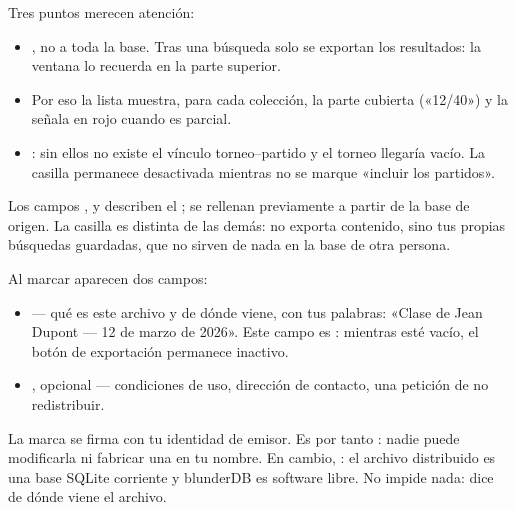 \documentclass[letterpaper,10pt,spanish]{sphinxmanual}
\begin{document}
\sphinxAtStartPar
Tres puntos merecen atención:
\begin{itemize}
\item {} 
\sphinxAtStartPar
{}, no a toda la base. Tras una búsqueda solo se exportan los resultados: la ventana lo recuerda en la parte superior.

\item {} 
\sphinxAtStartPar
{} Por eso la lista muestra, para cada colección, la parte cubierta («12/40») y la señala en rojo cuando es parcial.

\item {} 
\sphinxAtStartPar
{}: sin ellos no existe el vínculo torneo–partido y el torneo llegaría vacío. La casilla permanece desactivada mientras no se marque «incluir los partidos».

\end{itemize}

\sphinxAtStartPar
Los campos ,  y  describen el ; se rellenan previamente a partir de la base de origen. La casilla  es distinta de las demás: no exporta contenido, sino tus propias búsquedas guardadas, que no sirven de nada en la base de otra persona.

\sphinxAtStartPar
Al marcar  aparecen dos campos:
\begin{itemize}
\item {} 
\sphinxAtStartPar
{} — qué es este archivo y de dónde viene, con tus palabras: «Clase de Jean Dupont — 12 de marzo de 2026». Este campo es : mientras esté vacío, el botón de exportación permanece inactivo.

\item {} 
\sphinxAtStartPar
{}, opcional — condiciones de uso, dirección de contacto, una petición de no redistribuir.

\end{itemize}

\sphinxAtStartPar
La marca se firma con tu identidad de emisor. Es por tanto : nadie puede modificarla ni fabricar una en tu nombre. En cambio, : el archivo distribuido es una base SQLite corriente y blunderDB es software libre. No impide nada: dice de dónde viene el archivo.
\end{document}
